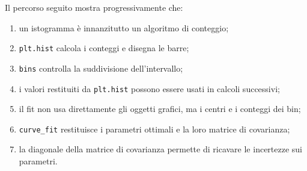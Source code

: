 Il percorso seguito mostra progressivamente che:

\begin{enumerate}
    \item un istogramma è innanzitutto un algoritmo di conteggio;
    \item \texttt{plt.hist} calcola i conteggi e disegna le barre;
    \item \texttt{bins} controlla la suddivisione dell'intervallo;
    \item i valori restituiti da \texttt{plt.hist} possono essere usati
          in calcoli successivi;
    \item il fit non usa direttamente gli oggetti grafici, ma i centri e
          i conteggi dei bin;
    \item \texttt{curve\_fit} restituisce i parametri ottimali e la loro
          matrice di covarianza;
    \item la diagonale della matrice di covarianza permette di ricavare
          le incertezze sui parametri.
\end{enumerate}
